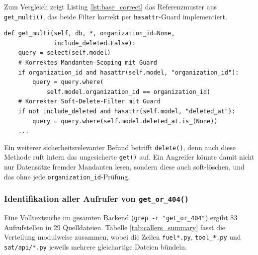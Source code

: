 Zum Vergleich zeigt Listing \ref{lst:base_correct} das Referenzmuster aus
\texttt{get\_multi()}, das beide Filter korrekt per \texttt{hasattr}-Guard implementiert.

\begin{lstlisting}[style=custompython,
  caption={Korrektes Referenzmuster aus \texttt{get\_multi()}},
  label={lst:base_correct}]
def get_multi(self, db, *, organization_id=None,
              include_deleted=False):
    query = select(self.model)
    # Korrektes Mandanten-Scoping mit Guard
    if organization_id and hasattr(self.model, "organization_id"):
        query = query.where(
            self.model.organization_id == organization_id)
    # Korrekter Soft-Delete-Filter mit Guard
    if not include_deleted and hasattr(self.model, "deleted_at"):
        query = query.where(self.model.deleted_at.is_(None))
    ...
\end{lstlisting}

Ein weiterer sicherheitsrelevanter Befund betrifft \texttt{delete()}, denn auch
diese Methode ruft intern das ungesicherte \texttt{get()} auf. Ein Angreifer
könnte damit nicht nur Datensätze fremder Mandanten lesen, sondern diese auch
soft-löschen, und das ohne jede \texttt{organization\_id}-Prüfung.

\subsubsection{Identifikation aller Aufrufer von \texttt{get\_or\_404()}}

Eine Volltextsuche im gesamten Backend (\texttt{grep -r "get\_or\_404"}) ergibt
83 Aufrufstellen in 29 Quelldateien. Tabelle \ref{tab:callers_summary}
fasst die Verteilung modulweise zusammen, wobei die Zeilen
\texttt{fuel*.py}, \texttt{tool\_*.py} und \texttt{sat/api/*.py} jeweils
mehrere gleichartige Dateien bündeln.

